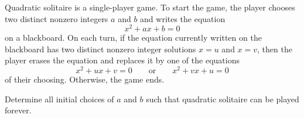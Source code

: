 Quadratic solitaire is a single-player game. To start the game, the player chooses two distinct nonzero integers $a$ and $b$ and writes the equation
\[
x^2+ax+b=0
\]
on a blackboard. On each turn, if the equation currently written on the blackboard has two distinct nonzero integer solutions $x=u$ and $x=v$, then the player erases the equation and replaces it by one of the equations
\[
x^2+ux+v=0 \qquad\text{or}\qquad x^2+vx+u=0
\]
of their choosing. Otherwise, the game ends.

Determine all initial choices of $a$ and $b$ such that quadratic solitaire can be played forever.
